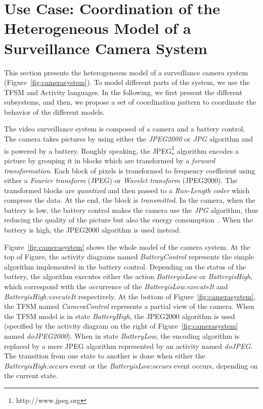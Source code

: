 \section{Use Case: Coordination of the Heterogeneous Model of a Surveillance Camera System}
This section presents the heterogeneous model of a surveillance camera system (Figure~\ref{fig:camerasystem}). To model different parts of the system, we use the TFSM and Activity languages. In the following, we first present the different subsystems, and then, we propose a set of coordination pattern to coordinate the behavior of the different models. 

The video surveillance system is composed of a camera and a battery control. The camera takes pictures by using either the \emph{JPEG2000} or \emph{JPG} algorithm and is powered by a battery. Roughly speaking, the JPEG\footnote{http://www.jpeg.org} algorithm encodes a picture by grouping it in blocks which are transformed by a \textit{forward transformation}. Each block of pixels is transformed to frequency coefficient using either a \textit{Fourier transform} (JPEG) or \textit{Wavelet transform} (JPEG2000). The transformed blocks are \textit{quantized} and then passed to a \textit{Run-Length coder} which compress the data. At the end, the block is \textit{transmitted}. In the camera, when the battery is low, the battery control makes the camera use the \emph{JPG} algorithm, thus reducing the quality of the picture but also the energy consumption~\cite{encodingcomparison}. When the battery is high, the JPEG2000 algorithm is used instead. 

Figure~\ref{fig:camerasystem} shows the whole model of the camera system. At the top of Figure, the activity diagrams named \emph{BatteryControl} represents the simple algorithm implemented in the battery control. Depending on the status of the battery, the algorithm executes either the action \emph{BatteryisLow} or \emph{BatteryisHigh}, which correspond with the occurrence of the \mse \emph{BatteryisLow:executeIt} and \emph{BatteryisHigh:executeIt} respectively. At the bottom of Figure~\ref{fig:camerasystem}, the TFSM named \emph{CameraControl} represents a partial view of the camera. When the TFSM model is in state \emph{BatteryHigh}, the JPEG2000 algorithm is used (specified by the activity diagram on the right of Figure~\ref{fig:camerasystem} named \emph{doJPEG2000}). When in state \emph{BatteryLow}, the encoding algorithm is replaced by a mere JPEG algorithm represented by an activity named \emph{doJPEG}. The transition from one state to another is done when either the \emph{BatteryisHigh:occurs} event or the \emph{BatteryisLow:occurs} event occurs, depending on the current state.	   

